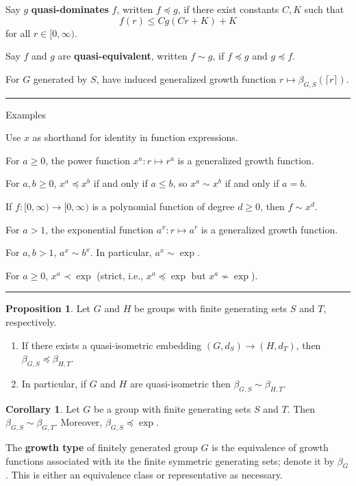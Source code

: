 \documentclass[12pt]{article}
\newcommand{\keyword}[1]{\textbf{#1}}
\newcommand{\sepline}{\rule{\textwidth}{0.4pt}}
\theoremstyle{definition}
\newtheorem{corollary}{Corollary}
\newtheorem{proposition}{Proposition}
\newcommand{\<}{\left\langle}
\renewcommand{\>}{\right\rangle}
\begin{document}
Say $g$ \keyword{quasi-dominates} $f$, written $f \preceq g$, if there exist constants $C, K$ such that
\[
    f(r) \leq Cg(Cr + K) + K
\]
for all $r \in [0, \infty)$.

Say $f$ and $g$ are \keyword{quasi-equivalent}, written $f \sim g$, if $f \preceq g$ and $g \preceq f$.

For $G$ generated by $S$, have induced generalized growth function $r \mapsto \beta_{G,S}(\lceil r \rceil)$.

\sepline

Examples

Use $x$ as shorthand for identity in function expressions.

For $a\geq 0$, the power function $x^a : r \mapsto r^a$ is a generalized growth function.

For $a, b \geq 0$, $x^a \preceq x^b$ if and only if $a \leq b$, so $x^a \sim x^b$ if and only if $a = b$.

If $f : [0, \infty) \to [0, \infty)$ is a polynomial function of degree $d \geq 0$, then $f \sim x^d$.

For $a > 1$, the exponential function $a^x : r \mapsto a^r$ is a generalized growth function.

For $a, b > 1$, $a^x \sim b^x$.
In particular, $a^x \sim \exp$.

For $a \geq 0$, $x^a \prec \exp$ (strict, i.e., $x^a \preceq \exp$ but $x^a \not\sim \exp$).

\sepline



\begin{proposition}
    Let $G$ and $H$ be groups with finite generating sets $S$ and $T$, respectively.
    \begin{enumerate}[(1)]
        \item If there exists a quasi-isometric embedding $(G, d_S) \to (H, d_T)$, then $\beta_{G,S} \preceq \beta_{H,T}$.
        \item In particular, if $G$ and $H$ are quasi-isometric then $\beta_{G,S} \sim \beta_{H,T}$.
    \end{enumerate}
\end{proposition}


\begin{corollary}
    Let $G$ be a group with finite generating sets $S$ and $T$.
    Then $\beta_{G,S} \sim \beta_{G,T}$.
    Moreover, $\beta_{G,S} \preceq \exp$.
\end{corollary}


The \keyword{growth type} of finitely generated group $G$ is the equivalence of growth functions associated with its the finite symmetric generating sets; denote it by $\beta_G$.
This is either an equivalence class or representative as necessary.
\end{document}
